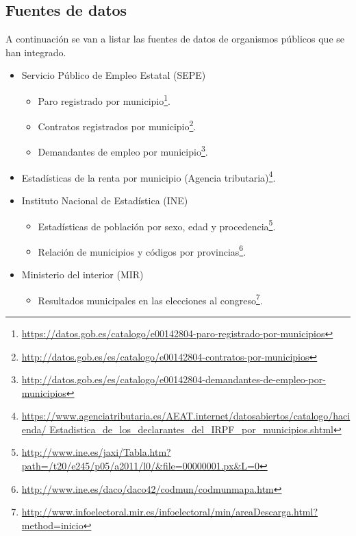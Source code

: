 \subsection{Fuentes de datos}

A continuación se van a listar las fuentes de datos de organismos públicos que se han integrado.

\begin{itemize}
	\tightlist
	\item
	Servicio Público de Empleo Estatal (SEPE)
	\begin{itemize}
		\tightlist
		\item
		Paro registrado por municipio\footnote{\href{https://datos.gob.es/catalogo/e00142804-paro-registrado-por-municipios}{https://datos.gob.es/catalogo/e00142804-paro-registrado-por-municipios}}.
		\item
		Contratos registrados por municipio\footnote{\href{http://datos.gob.es/es/catalogo/e00142804-contratos-por-municipios}{http://datos.gob.es/es/catalogo/e00142804-contratos-por-municipios}}.
		\item
		Demandantes de empleo por municipio\footnote{\href{http://datos.gob.es/es/catalogo/e00142804-demandantes-de-empleo-por-municipios}{http://datos.gob.es/es/catalogo/e00142804-demandantes-de-empleo-por-municipios}}.
	\end{itemize}
	\item 
	Estadísticas de la renta por municipio (Agencia tributaria)\footnote{\href{https://www.agenciatributaria.es/AEAT.internet/datosabiertos/catalogo/hacienda/Estadistica\_de\_los\_declarantes\_del\_IRPF\_por\_municipios.shtml}{https://www.agenciatributaria.es/AEAT.internet/datosabiertos/catalogo/hacienda/ Estadistica\_de\_los\_declarantes\_del\_IRPF\_por\_municipios.shtml}}.
	\item
	Instituto Nacional de Estadística (INE)
	\begin{itemize}
		\item
		Estadísticas de población por sexo, edad y procedencia\footnote{\href{http://www.ine.es/jaxi/Tabla.htm?path=/t20/e245/p05/a2011/l0/\&file=00000001.px\&L=0}{http://www.ine.es/jaxi/Tabla.htm?path=/t20/e245/p05/a2011/l0/\&file=00000001.px\&L=0}}.
		\item
		Relación de municipios y códigos por provincias\footnote{\href{http://www.ine.es/daco/daco42/codmun/codmunmapa.htm}{http://www.ine.es/daco/daco42/codmun/codmunmapa.htm}}.
	\end{itemize}
	\item
	Ministerio del interior (MIR)
	\begin{itemize}
		\item 
		Resultados municipales en las elecciones al congreso\footnote{\href{http://www.infoelectoral.mir.es/infoelectoral/min/areaDescarga.html?method=inicio}{http://www.infoelectoral.mir.es/infoelectoral/min/areaDescarga.html?method=inicio}}.
	\end{itemize}
\end{itemize}


